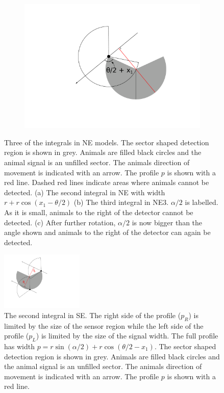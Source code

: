 \begin{figure}[t]
\begin{subfigure}[t]{0.3\textwidth}
                       \includegraphics[width=1\textwidth, trim=5cm 1cm 4cm 1cm]{imgs/ne34.pdf}
                \caption{}
                \label{f:NE3fourth}
        \end{subfigure}

\caption[Three of the integrals in NE models]{Three of the integrals in NE models. The sector shaped detection region is shown in grey. Animals are filled black circles and the animal signal is an unfilled sector. The animals direction of movement is indicated with an arrow. The profile $p$ is shown with a red line. Dashed red lines indicate areas where animals cannot be detected. (a) The second integral in NE with width $r + r\cos(x_1 - \theta/2)$ (b) The third integral in NE3. $\alpha/2$ is labelled. As it is small, animals to the right of the detector cannot be detected. (c) After further rotation, $\alpha/2$ is now bigger than the angle shown and animals to the right of the detector can again be detected.}
\label{f:NE}
\end{figure}


\begin{figure}[t]
        \centering
        \includegraphics[width=0.35\textwidth, trim=1cm 4cm 9cm 1cm]{imgs/se3.pdf}
\caption[The second integral in SE]{The second integral in SE. The right side of the profile ($p_R$) is limited by the size of the sensor region  while the left side of the profile ($p_L$) is limited by the size of the signal width. The full profile has width $p = r\sin(\alpha/2) +r\cos(\theta/2-x_1)$. The sector shaped detection region is shown in grey. Animals are filled black circles and the animal signal is an unfilled sector. The animals direction of movement is indicated with an arrow. The profile $p$ is shown with a red line.   }
\label{f:se3}
\end{figure}

